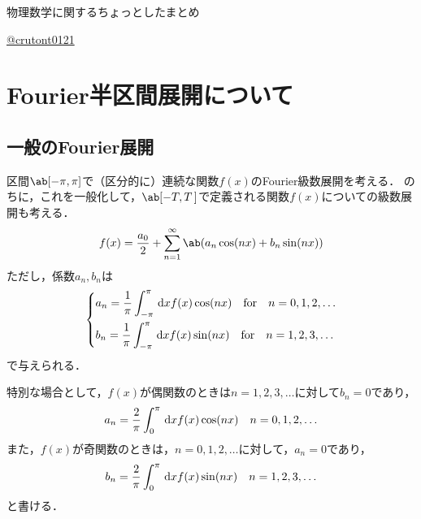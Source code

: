 

\pagestyle{fancy}  
\fancyhead[L]{\textsc{\leftmark}}
\fancyhead[C]{}  
\fancyhead[R]{\textbf{\thepage}}  
\fancyfoot{}




\renewcommand{\contentsname}{Contents}
\renewcommand{\headrulewidth}{0.1pt}


\begin{screen}
  \centering
  物理数学に関するちょっとしたまとめ
\end{screen}
\begin{flushright}
  \href{https://github.com/crutont0121}{@crutont0121}
\end{flushright}
\tableofcontents
\hrulefill
\clearpage

\section{Fourier半区間展開について}
\subsection{一般のFourier展開}
区間$\ab[-\pi, \pi]$で（区分的に）連続な関数$f(x)$のFourier級数展開を考える．
のちに，これを一般化して，$\ab[-T, T\,]$で定義される関数$f(x)$についての級数展開も考える．
\begin{gather}  
  f(x) = \frac{a_0}{2} + \sum_{n=1}^\infty \ab(a_n\cos(nx) + b_n\sin(nx))
\end{gather}
ただし，係数$a_n, b_n$は
\begin{gather}
  \begin{dcases}
    a_n = \frac{1}{\pi} \int_{-\pi}^{\pi} \dl{x} f(x) \cos (nx) \qq\text{for}\qq n = 0, 1, 2, \ldots\\
    b_n = \frac{1}{\pi} \int_{-\pi}^{\pi} \dl{x} f(x) \sin (nx) \qq\text{for}\qq n = 1, 2, 3, \ldots\\
  \end{dcases}
\end{gather}
で与えられる．

特別な場合として，$f(x)$が偶関数のときは$n = 1, 2, 3, \ldots$に対して$b_n = 0$であり，
\begin{gather}
  a_n = \frac{2}{\pi} \int_0^\pi \dl{x} f(x) \cos(nx) \qq n = 0, 1, 2, \ldots
\end{gather}
また，$f(x)$が奇関数のときは，$n = 0, 1, 2, \ldots$に対して，$a_n = 0$であり，
\begin{gather}
  b_n = \frac{2}{\pi} \int_0^\pi \dl{x} f(x) \sin(nx) \qq n = 1, 2, 3, \ldots
\end{gather}
と書ける．

